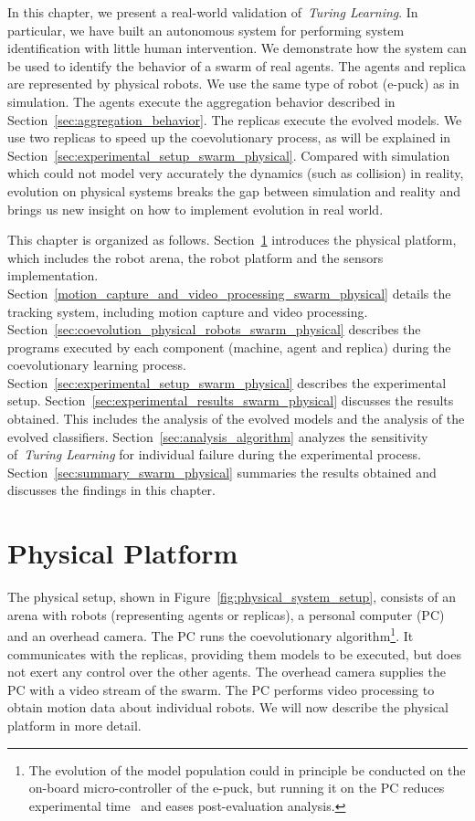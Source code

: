 In this chapter, we present a real-world validation of~\textit{Turing Learning}. In particular, we have built an autonomous system for performing system identification with little human intervention. We demonstrate how the system can be used to identify the behavior of a swarm of real agents. The agents and replica are represented by physical robots. We use the same type of robot (e-puck) as in simulation. The agents execute the aggregation behavior described in Section~\ref{sec:aggregation_behavior}. The replicas execute the evolved models. We use two replicas to speed up the coevolutionary process, as will be explained in Section~\ref{sec:experimental_setup_swarm_physical}. Compared with simulation which  could not model very accurately the dynamics (such as collision) in reality, evolution on physical systems breaks the gap between simulation and reality and brings us new insight on how to implement evolution in real world. 

This chapter is organized as follows. Section~\ref{sec:experimental_platform_swarm_physical} introduces the physical platform, which includes the robot arena, the robot platform and the sensors implementation. Section~\ref{motion_capture_and_video_processing_swarm_physical} details the tracking system, including motion capture and video processing. Section~\ref{sec:coevolution_physical_robots_swarm_physical} describes the programs executed by each component (machine, agent and replica) during the coevolutionary learning process. Section~\ref{sec:experimental_setup_swarm_physical} describes the experimental setup. Section~\ref{sec:experimental_results_swarm_physical} discusses the results obtained. This includes the analysis of the evolved models and the analysis of the evolved classifiers. Section~\ref{sec:analysis_algorithm} analyzes the sensitivity of~\textit{Turing Learning} for individual failure during the experimental process. Section~\ref{sec:summary_swarm_physical} summaries the results obtained and discusses the findings in this chapter.

\section{Physical Platform}\label{sec:experimental_platform_swarm_physical}

The physical setup, shown in Figure~\ref{fig:physical_system_setup}, consists of an arena with robots (representing agents or replicas), a personal computer (PC) and an overhead camera. The PC runs the coevolutionary algorithm\footnote{The evolution of the model population could in principle be conducted on the on-board micro-controller of the e-puck, but running it on the PC reduces experimental time~\cite{Floreano1996} and eases post-evaluation analysis.}. It communicates with the replicas, providing them models to be executed, but does not exert any control over the other agents. The overhead camera supplies the PC with a video stream of the swarm. The PC performs video processing to obtain motion data about individual robots. We will now describe the physical platform in more detail.

